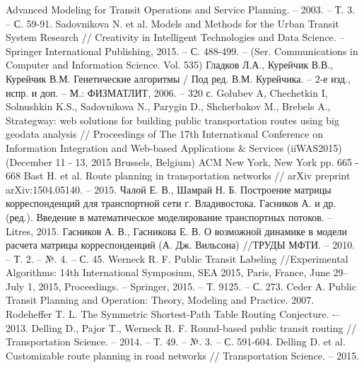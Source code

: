 \begin{thebibliography}{10}
        Advanced Modeling for Transit Operations and Service Planning. -- 2003. -- Т. 3. -- С. 59-91.
     Sadovnikova N. et al. Models and Methods for the Urban Transit System Research //
        Creativity in Intelligent Technologies and Data Science. -- Springer International Publishing, 
        2015. -- С. 488-499. -- (Ser. Communications in Computer and Information Science. Vol. 535)
     Гладков Л.А., Курейчик В.В., Курейчик В.М. Генетические алгоритмы / 
        Под ред. В.М. Курейчика. -- 2-е изд., испр. и доп. -- М.: ФИЗМАТЛИТ, 2006. -- 320 с.
     Golubev A, Chechetkin I, Solnushkin K.S., Sadovnikova N., Parygin D., Shcherbakov M., 
        Brebels A., Strategway: web solutions for building public transportation routes using big geodata 
        analysis // Proceedings of The 17th International Conference on Information Integration and 
        Web-based Applications \& Services (iiWAS2015) (December 11 - 13, 2015 Brussels, Belgium) 
        ACM New York, New York pp. 665 - 668
     Bast H. et al. Route planning in transportation networks //
        arXiv preprint arXiv:1504.05140. -- 2015.
     Чалой Е. В., Шамрай Н. Б. Построение матрицы корреспонденций для транспортной 
        сети г. Владивостока.
     Гасников А. и др. (ред.). Введение в математическое моделирование транспортных 
        потоков. -- Litres, 2015.
     Гасников А. В., Гасникова Е. В. О возможной динамике в модели расчета матрицы 
        корреспонденций (А. Дж. Вильсона) //ТРУДЫ МФТИ. -- 2010. -- Т. 2. -- №. 4. -- С. 45.
     Werneck R. F. Public Transit Labeling //Experimental Algorithms: 
        14th International Symposium, SEA 2015, Paris, France, June 29–July 1, 2015, 
        Proceedings. -- Springer, 2015. -- Т. 9125. -- С. 273.
     Ceder A. Public Transit Planning and Operation: Theory, Modeling and Practice. 2007.
     Rodeheffer T. L. The Symmetric Shortest-Path Table Routing 
        Conjecture. -– 2013.
     Delling D., Pajor T., Werneck R. F. Round-based public transit routing //
        Transportation Science. -- 2014. -- Т. 49. -- №. 3. -- С. 591-604.
     Delling D. et al. Customizable route planning in road networks //
        Transportation Science. -- 2015.

\end{thebibliography}

